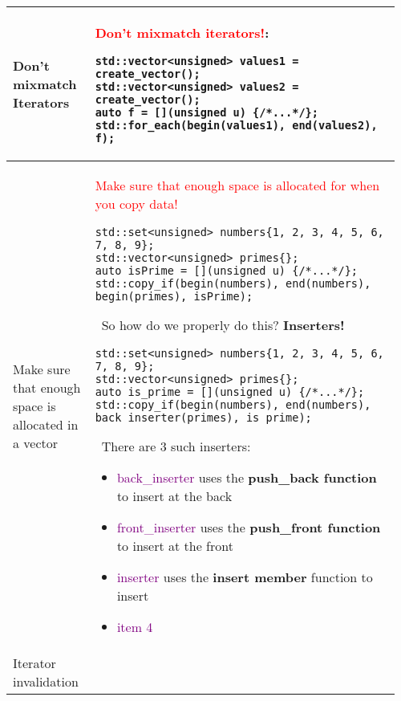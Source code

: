 \documentclass[main.tex,fontsize=8pt,paper=a4,paper=portrait,DIV=calc]{scrartcl}
\begin{document}
\begin{table}[ht!]
\begin{tabular}{|m{0.2\linewidth}|m{0.755\linewidth}|}
\hline
Don't mixmatch Iterators & 
\textcolor{red}{Don't mixmatch iterators!}:\newline
\begin{lstlisting}
std::vector<unsigned> values1 = create_vector();
std::vector<unsigned> values2 = create_vector();
auto f = [](unsigned u) {/*...*/};
std::for_each(begin(values1), end(values2), f);
\end{lstlisting}
\\
\hline
Make sure that enough space is allocated in a vector & 
\textcolor{red}{Make sure that enough space is allocated for when you copy data!}\newline
\begin{lstlisting}
std::set<unsigned> numbers{1, 2, 3, 4, 5, 6, 7, 8, 9};
std::vector<unsigned> primes{};
auto isPrime = [](unsigned u) {/*...*/};
std::copy_if(begin(numbers), end(numbers), begin(primes), isPrime);
\end{lstlisting}
\, \newline
So how do we properly do this? \textbf{Inserters!}\newline
\begin{lstlisting}
std::set<unsigned> numbers{1, 2, 3, 4, 5, 6, 7, 8, 9};
std::vector<unsigned> primes{};
auto is_prime = [](unsigned u) {/*...*/};
std::copy_if(begin(numbers), end(numbers), back_inserter(primes), is_prime);
\end{lstlisting}
\, \newline
There are 3 such inserters:\newline
\begin{itemize}
\item \textcolor{purple}{back\_inserter}\newline
  uses the \textbf{push\_back function} to insert at the back
\item \textcolor{purple}{front\_inserter}\newline
  uses the \textbf{push\_front function} to insert at the front
\item \textcolor{purple}{inserter}\newline
  uses the \textbf{insert member} function to insert
\item \textcolor{purple}{item 4}
\vspace{-3mm}
\end{itemize} \\
\hline
Iterator invalidation & 

\end{tabular}
\end{table}
\end{document}
